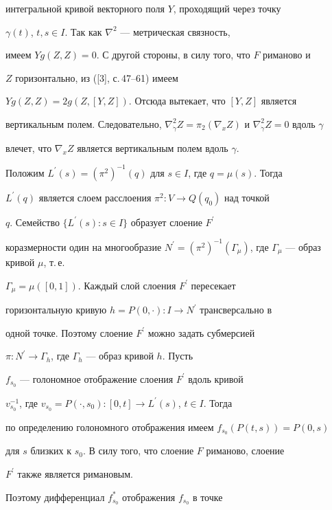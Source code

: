 \begin{pf}
интегральной кривой векторного поля $Y$, проходящий через точку 


$\gamma(t)$, $t,s\in I$. Так как $\nabla^2$ --- метрическая связность, 


имеем $Yg(Z,Z)=0$. С другой стороны, в силу того, что $F$ риманово и 


$Z$ горизонтально, из ([3], с.\,47--61) имеем


$Yg(Z,Z)= 2g(Z,[Y,Z])$. Отсюда вытекает, что $[Y,Z]$ является 


вертикальным полем. Следовательно, $\nabla^2_{\Dot 


\gamma}Z=\pi_2(\nabla_xZ)$ и $\nabla^2_{\Dot \gamma}Z=0$ вдоль $\gamma$ 


влечет, что $\nabla_xZ$ является вертикальным полем вдоль $\gamma$. 





Положим $L^\prime(s)=(\pi^2)^{-1}(q)$ для $s \in I$, где $q=\mu(s)$. Тогда 


$L^\prime(q)$ является слоем расслоения $\pi^2:V\to Q(q_0)$ над точкой 


$q$. Семейство $\{L^\prime(s):s\in I\}$ образует слоение $F^\prime$ 


коразмерности один на многообразие $N^\prime=(\pi^2)^{-


1}(\Gamma_\mu)$, где $\Gamma_\mu$ --- образ кривой $\mu$, т.\,е. 


$\Gamma_\mu=\mu([0,1])$. Каждый слой слоения $F^\prime$ пересекает 


горизонтальную кривую $h=P(0, \cdot):I\to N^\prime$ трансверсально в 


одной точке. Поэтому слоение $F^\prime$ можно задать субмерсией 


$\pi:N^\prime\to \Gamma_h$, где $\Gamma_h$ --- образ кривой $h$. Пусть 


$f_{s_0}$ --- голономное отображение слоения $F^\prime$ вдоль кривой 


$v_{s_0}^{-1}$, где $v_{s_0}=P(\cdot, 


s_0):[0, t]\to L^\prime(s)$, $t\in I$. Тогда 


по определению голономного отображения имеем $f_{s_0}(P(t, s))=P(0, s)$ 


для $s$ близких к $s_0$. В силу того, что слоение $F$ риманово, слоение 


$F^\prime$ также является римановым.


Поэтому дифференциал $f^*_{s_0}$ отображения $f_{s_0}$ в точке 



\end{pf}
